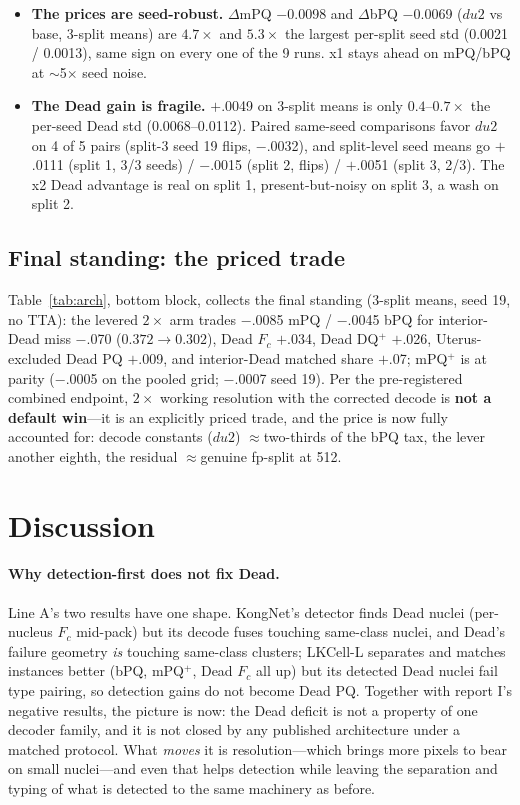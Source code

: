 \documentclass[11pt]{article}
\begin{document}
\begin{itemize}
\item \textbf{The prices are seed-robust.} $\Delta$mPQ $-$0.0098 and $\Delta$bPQ $-$0.0069
($du2$ vs base, 3-split means) are $4.7\times$ and $5.3\times$ the largest per-split seed
std (0.0021 / 0.0013), same sign on every one of the 9 runs. x1 stays ahead on mPQ/bPQ at
$\sim$5$\times$ seed noise.
\item \textbf{The Dead gain is fragile.} $+$.0049 on 3-split means is only
$0.4$--$0.7\times$ the per-seed Dead std (0.0068--0.0112). Paired same-seed comparisons
favor $du2$ on 4 of 5 pairs (split-3 seed 19 flips, $-$.0032), and split-level seed means go
$+$.0111 (split 1, 3/3 seeds) / $-$.0015 (split 2, flips) / $+$.0051 (split 3, 2/3). The x2
Dead advantage is real on split 1, present-but-noisy on split 3, a wash on split 2.
\end{itemize}

\subsection{Final standing: the priced trade}
\label{sec:final}

Table~\ref{tab:arch}, bottom block, collects the final standing (3-split means, seed 19, no
TTA): the levered $2\times$ arm trades $-$.0085 mPQ / $-$.0045 bPQ for interior-Dead miss
$-$.070 ($0.372\!\to\!0.302$), Dead $F_c$ $+$.034, Dead DQ$^+$ $+$.026, Uterus-excluded Dead
PQ $+$.009, and interior-Dead matched share $+$.07; mPQ$^+$ is at parity ($-$.0005 on the
pooled grid; $-$.0007 seed 19). Per the pre-registered combined endpoint, $2\times$ working
resolution with the corrected decode is \textbf{not a default win}---it is an explicitly
priced trade, and the price is now fully accounted for: decode constants ($du2$)
$\approx$two-thirds of the bPQ tax, the lever another eighth, the residual $\approx$genuine
fp-split at 512.

\section{Discussion}
\label{sec:discussion}

\paragraph{Why detection-first does not fix Dead.} Line A's two results have one shape.
KongNet's detector finds Dead nuclei (per-nucleus $F_c$ mid-pack) but its decode fuses
touching same-class nuclei, and Dead's failure geometry \emph{is} touching same-class
clusters; LKCell-L separates and matches instances better (bPQ, mPQ$^+$, Dead $F_c$ all up)
but its detected Dead nuclei fail type pairing, so detection gains do not become Dead PQ.
Together with report I's negative results, the picture is now: the Dead deficit is not a
property of one decoder family, and it is not closed by any published architecture under a
matched protocol. What \emph{moves} it is resolution---which brings more pixels to bear on
small nuclei---and even that helps detection while leaving the separation and typing of what
is detected to the same machinery as before.
\end{document}
